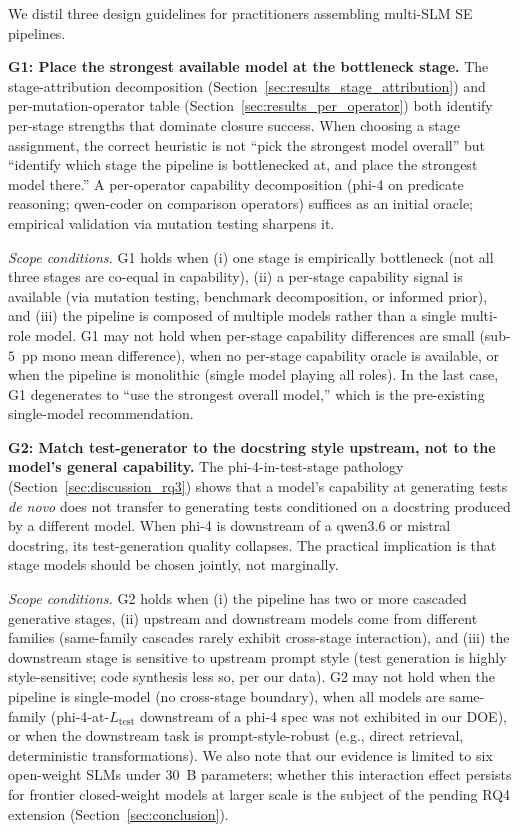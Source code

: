 We distil three design guidelines for practitioners assembling multi-SLM SE pipelines.

\textbf{G1: Place the strongest available model at the bottleneck stage.} The stage-attribution decomposition (Section~\ref{sec:results_stage_attribution}) and per-mutation-operator table (Section~\ref{sec:results_per_operator}) both identify per-stage strengths that dominate closure success. When choosing a stage assignment, the correct heuristic is not ``pick the strongest model overall'' but ``identify which stage the pipeline is bottlenecked at, and place the strongest model there.'' A per-operator capability decomposition (phi-4 on predicate reasoning; qwen-coder on comparison operators) suffices as an initial oracle; empirical validation via mutation testing sharpens it.

\emph{Scope conditions.} G1 holds when (i) one stage is empirically bottleneck (not all three stages are co-equal in capability), (ii) a per-stage capability signal is available (via mutation testing, benchmark decomposition, or informed prior), and (iii) the pipeline is composed of multiple models rather than a single multi-role model. G1 may not hold when per-stage capability differences are small (sub-$5$~pp mono mean difference), when no per-stage capability oracle is available, or when the pipeline is monolithic (single model playing all roles). In the last case, G1 degenerates to ``use the strongest overall model,'' which is the pre-existing single-model recommendation.

\textbf{G2: Match test-generator to the docstring style upstream, not to the model's general capability.} The phi-4-in-test-stage pathology (Section~\ref{sec:discussion_rq3}) shows that a model's capability at generating tests \emph{de novo} does not transfer to generating tests conditioned on a docstring produced by a different model. When phi-4 is downstream of a qwen3.6 or mistral docstring, its test-generation quality collapses. The practical implication is that stage models should be chosen jointly, not marginally.

\emph{Scope conditions.} G2 holds when (i) the pipeline has two or more cascaded generative stages, (ii) upstream and downstream models come from different families (same-family cascades rarely exhibit cross-stage interaction), and (iii) the downstream stage is sensitive to upstream prompt style (test generation is highly style-sensitive; code synthesis less so, per our data). G2 may not hold when the pipeline is single-model (no cross-stage boundary), when all models are same-family (phi-4-at-$L_{\text{test}}$ downstream of a phi-4 spec was not exhibited in our DOE), or when the downstream task is prompt-style-robust (e.g., direct retrieval, deterministic transformations). We also note that our evidence is limited to six open-weight SLMs under 30~B parameters; whether this interaction effect persists for frontier closed-weight models at larger scale is the subject of the pending RQ4 extension (Section~\ref{sec:conclusion}).

